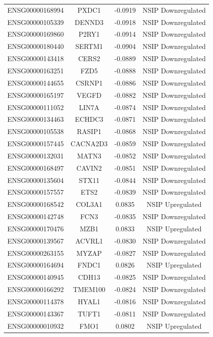 \documentclass[
]{article}
\begin{document}
\begin{singlespace}
\begin{longtable}[t]{lccc}
ENSG00000168994 & PXDC1 & -0.0919 & NSIP Downregulated\\
ENSG00000105339 & DENND3 & -0.0918 & NSIP Downregulated\\
ENSG00000169860 & P2RY1 & -0.0914 & NSIP Downregulated\\
ENSG00000180440 & SERTM1 & -0.0904 & NSIP Downregulated\\
\addlinespace
ENSG00000143418 & CERS2 & -0.0889 & NSIP Downregulated\\
ENSG00000163251 & FZD5 & -0.0888 & NSIP Downregulated\\
ENSG00000144655 & CSRNP1 & -0.0886 & NSIP Downregulated\\
ENSG00000165197 & VEGFD & -0.0882 & NSIP Downregulated\\
ENSG00000111052 & LIN7A & -0.0874 & NSIP Downregulated\\
\addlinespace
ENSG00000134463 & ECHDC3 & -0.0871 & NSIP Downregulated\\
ENSG00000105538 & RASIP1 & -0.0868 & NSIP Downregulated\\
ENSG00000157445 & CACNA2D3 & -0.0859 & NSIP Downregulated\\
ENSG00000132031 & MATN3 & -0.0852 & NSIP Downregulated\\
ENSG00000168497 & CAVIN2 & -0.0851 & NSIP Downregulated\\
\addlinespace
ENSG00000135604 & STX11 & -0.0844 & NSIP Downregulated\\
ENSG00000157557 & ETS2 & -0.0839 & NSIP Downregulated\\
ENSG00000168542 & COL3A1 & 0.0835 & NSIP Upregulated\\
ENSG00000142748 & FCN3 & -0.0835 & NSIP Downregulated\\
ENSG00000170476 & MZB1 & 0.0833 & NSIP Upregulated\\
\addlinespace
ENSG00000139567 & ACVRL1 & -0.0830 & NSIP Downregulated\\
ENSG00000263155 & MYZAP & -0.0827 & NSIP Downregulated\\
ENSG00000164694 & FNDC1 & 0.0826 & NSIP Upregulated\\
ENSG00000140945 & CDH13 & -0.0825 & NSIP Downregulated\\
ENSG00000166292 & TMEM100 & -0.0824 & NSIP Downregulated\\
\addlinespace
ENSG00000114378 & HYAL1 & -0.0816 & NSIP Downregulated\\
ENSG00000143367 & TUFT1 & -0.0811 & NSIP Downregulated\\
ENSG00000010932 & FMO1 & 0.0802 & NSIP Upregulated\\

\end{longtable}
\end{singlespace}
\end{document}
